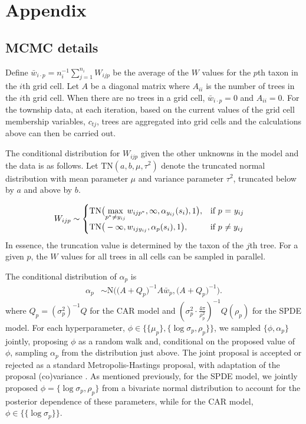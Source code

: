 \documentclass[12pt]{article}\usepackage[]{graphicx}\usepackage[]{color}
\begin{document}
\section{Appendix}


\subsection{MCMC details}

Define $\bar{w}_{i\cdot p}=n_{i}^{-1}{\displaystyle \sum_{j=1}^{n_{i}}W_{ijp}}$
be the average of the $W$ values for the $p$th taxon in the $i$th
grid cell. Let $A$ be a diagonal matrix where $A_{ii}$ is the number
of trees in the $i$th grid cell. When there are no trees in a grid
cell, $\bar{w}_{i\cdot p}=0$ and $A_{ii}=0$. For the township data,
at each iteration, based on the current values of the grid cell membership
variables, $c_{tj}$, trees are aggregated into grid cells and the
calculations above can then be carried out.

The conditional distribution for $W_{ijp}$ given the other unknowns
in the model and the data is as follows. Let $\mbox{TN}(a,b,\mu,\tau^{2})$
denote the truncated normal distribution with mean parameter $\mu$
and variance parameter $\tau^{2}$, truncated below by $a$ and above
by $b$. 

\begin{align}
W_{ijp} & \sim\begin{cases}
\mbox{TN}\big({\displaystyle \max_{p^{*}\neq y_{ij}}w_{ijp^{*}},\infty,\alpha_{y_{ij}}(s_{i}),1\big),} & \mbox{if }p\mbox{ = \ensuremath{y_{ij}}}\\
\mbox{TN}\big(-\infty,w_{ijy_{ij}},\alpha_{p}(s_{i}),1\big), & \mbox{if }p\mbox{ \ensuremath{\neq y_{ij}}}
\end{cases}\label{sampW}
\end{align}
In essence, the truncation value is determined by the taxon of the
$j$th tree. For a given $p$, the $W$ values for all trees in all
cells can be sampled in parallel. 

The conditional distribution of $\alpha_{p}$ is 
\begin{align}
\alpha_{p} & \sim\mbox{N}\bigg(\Big(A+Q_{p}\Big)^{-1}A\bar{w}_{p},\Big(A+Q_{p}\Big)^{-1}\bigg).\label{sampalpha}
\end{align}
where $Q_{p}=(\sigma_{p}^{2})^{-1}Q$ for the CAR model and $\left(\sigma_{p}^{2}\cdot\frac{4\pi}{\rho_{p}^{2}}\right)^{-1}Q(\rho_{p})$
for the SPDE model. For each hyperparameter, $\phi\in\{\{\mu_{p}\},\{\log\sigma_{p},\rho_{p}\}\}$,
we sampled $\{\phi,\alpha_{p}\}$ jointly, proposing $\phi$ as a
random walk and, conditional on the proposed value of $\phi$, sampling
$\alpha_{p}$ from the distribution just above. The joint proposal
is accepted or rejected as a standard Metropolis-Hastings proposal,
with adaptation of the proposal (co)variance \citep{Shab:Well:2011}.
As mentioned previously, for the SPDE model, we jointly proposed $\phi=\{\log\sigma_{p},\rho_{p}\}$
from a bivariate normal distribution to account for the posterior
dependence of these parameters, while for the CAR model, $\phi\in\{\{\log\sigma_{p}\}\}$. 
\end{document}
